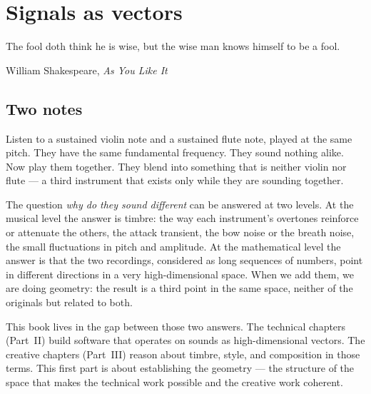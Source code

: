%

\chapter{Signals as vectors}

\epigraph{The fool doth think he is wise, but the wise man knows himself
to be a fool.}{William Shakespeare, \emph{As You Like It}}

\section{Two notes}

\noindent Listen to a sustained violin note and a sustained flute note,
played at the same pitch.  They have the same fundamental frequency.
They sound nothing alike.  Now play them together.  They blend into
something that is neither violin nor flute --- a third instrument that
exists only while they are sounding together.


The question \emph{why do they sound different} can be answered at two
levels.  At the musical level the answer is timbre: the way each
instrument's overtones reinforce or attenuate the others, the attack
transient, the bow noise or the breath noise, the small fluctuations in
pitch and amplitude.  At the mathematical level the answer is that the
two recordings, considered as long sequences of numbers, point in
different directions in a very high-dimensional space.  When we add them,
we are doing geometry: the result is a third point in the same space,
neither of the originals but related to both.

This book lives in the gap between those two answers.  The technical
chapters (Part~\textsc{II}) build software that operates on sounds as
high-dimensional vectors.  The creative chapters (Part~\textsc{III})
reason about timbre, style, and composition in those terms.  This first
part is about establishing the geometry --- the structure of the space
that makes the technical work possible and the creative work coherent.

